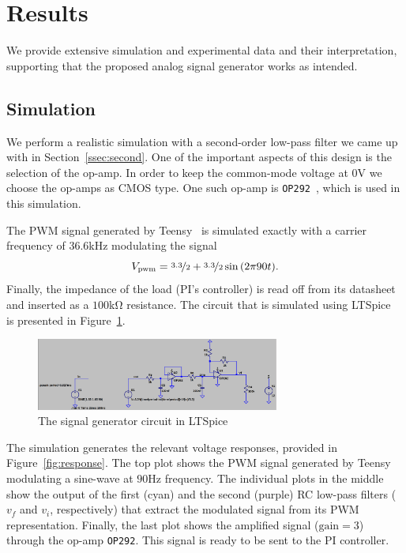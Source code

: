 \vspace{-1em}
\section{Results}
\label{sec:results}
\vspace{-1em}

We provide extensive simulation and experimental data and their interpretation,
supporting that the proposed analog signal generator works as intended.

\vspace{-1em}
\subsection{Simulation}
\vspace{-1em}

We perform a realistic simulation with a second-order low-pass filter we came up
with in Section~\ref{ssec:second}. One of the important aspects of this design
is the selection of the op-amp. In order to keep the common-mode voltage at
$0$\unit{\volt} we choose the op-amps as CMOS type. One such op-amp is
\texttt{OP292}~\cite{op292}, which is used in this simulation.

The PWM signal generated by Teensy~\cite{teensy} is simulated exactly with a
carrier frequency of $36.6$\unit{\kilo\hertz} modulating the signal \[
V_{\text{pwm}} = \nicefrac{3.3}{2} + \nicefrac{3.3}{2}\sin{(2\pi 90 t)}.\]
Finally, the impedance of the load (PI's controller) is read off from its
datasheet and inserted as a $100$\unit{\kilo\ohm} resistance. The circuit that
is simulated using LTSpice~\cite{ltspice} is presented in
Figure~\ref{fig:real_sig_gen}.

\begin{figure}[htb] 
\includegraphics[width=8cm]{./figures/circuit.png}
\caption{The signal generator circuit in LTSpice} 
\label{fig:real_sig_gen}
\end{figure}

The simulation generates the relevant voltage responses, provided in
Figure~\ref{fig:response}. The top plot shows the PWM signal generated by Teensy
modulating a sine-wave at $90$\unit{\hertz} frequency. The individual plots in
the middle show the output of the first (cyan) and the second (purple) RC
low-pass filters ($v_f$ and $v_i$, respectively) that extract the modulated
signal from its PWM representation. Finally, the last plot shows the amplified
signal ($\text{gain}=3$) through the op-amp \texttt{OP292}. This signal is ready
to be sent to the PI controller.

